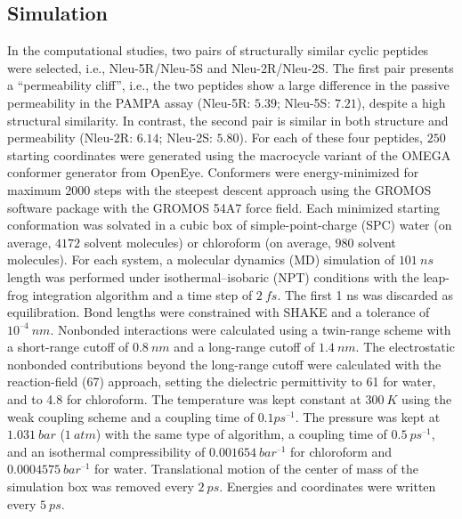 \subsection{Simulation}
In the computational studies, two pairs of structurally similar cyclic peptides were selected, i.e., Nleu-5R/Nleu-5S and Nleu-2R/Nleu-2S. 
The first pair presents a “permeability cliff”, i.e., the two peptides show a large difference in the passive permeability in the PAMPA assay (Nleu-5R: $5.39$; Nleu-5S: $7.21$), despite a high structural similarity. 
In contrast, the second pair is similar in both structure and permeability (Nleu-2R: $6.14$; Nleu-2S: $5.80$). 
For each of these four peptides, $250$ starting coordinates were generated using the macrocycle variant of the OMEGA conformer generator from OpenEye. \cite{Hawkins2012, Hawkins2010, Poongavanam2018}
Conformers were energy-minimized for maximum $2000$ steps with the steepest descent \cite{Ruder2016} approach using the GROMOS software package \cite{Schmid2012} with the GROMOS 54A7 force field. \cite{Schmid2011} 
Each minimized starting conformation was solvated in a cubic box of simple-point-charge (SPC) water \cite{Berendsen1981} (on average, $4172$ solvent molecules) or chloroform \cite{Tironi1994} (on average, $980$ solvent molecules). 
For each system, a molecular dynamics (MD) simulation of $101~ns$ length was performed under isothermal–isobaric (NPT) conditions with the leap-frog integration algorithm \cite{Gunsteren1988} and a time step of $2~fs$. 
The first 1 ns was discarded as equilibration. Bond lengths were constrained with SHAKE \cite{Ryckaert1977} and a tolerance of $10^{–4}~nm$. 
Nonbonded interactions were calculated using a twin-range scheme with a short-range cutoff of $0.8~nm$ and a long-range cutoff of $1.4~nm$. 
The electrostatic nonbonded contributions beyond the long-range cutoff were calculated with the reaction-field \cite{tironi1995} (67) approach, setting the dielectric permittivity to 61 \cite{Heinz2001} for water, and to 4.8 \cite{Tironi1994} for chloroform. 
The temperature was kept constant at $300~K$ using the weak coupling scheme \cite{Berendsen1984} and a coupling time of $0.1 ps^{–1}$. 
The pressure was kept at $1.031~bar$ ($1~atm$) with the same type of algorithm, a coupling time of $0.5~ps^{–1}$, and an isothermal compressibility of $0.001654~bar^{–1}$ for chloroform and $0.0004575~bar^{–1}$ for water. 
Translational motion of the center of mass of the simulation box was removed every $2~ps$. Energies and coordinates were written every $5~ps$.

